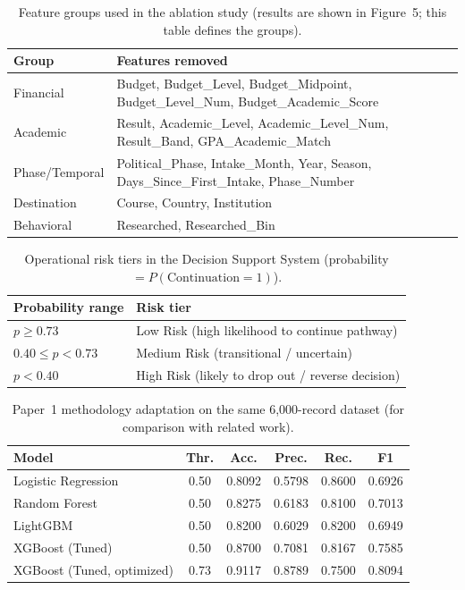 \begin{table}[htbp]
\centering
\caption{Feature groups used in the ablation study
(results are shown in Figure~5; this table defines the groups).}
\label{tab:ablation_groups}
\begin{tabular}{lp{9cm}}
\toprule
\textbf{Group} & \textbf{Features removed} \\
\midrule
Financial & Budget, Budget\_Level, Budget\_Midpoint, Budget\_Level\_Num, Budget\_Academic\_Score \\
Academic & Result, Academic\_Level, Academic\_Level\_Num, Result\_Band, GPA\_Academic\_Match \\
Phase/Temporal & Political\_Phase, Intake\_Month, Year, Season, Days\_Since\_First\_Intake, Phase\_Number \\
Destination & Course, Country, Institution \\
Behavioral & Researched, Researched\_Bin \\
\bottomrule
\end{tabular}
\end{table}


\begin{table}[htbp]
\centering
\caption{Operational risk tiers in the Decision Support System
(probability $= P(\mathrm{Continuation}=1)$).}
\label{tab:risk_tiers}
\begin{tabular}{lp{8.5cm}}
\toprule
\textbf{Probability range} & \textbf{Risk tier} \\
\midrule
$p \ge 0.73$ & Low Risk (high likelihood to continue pathway) \\
$0.40 \le p < 0.73$ & Medium Risk (transitional / uncertain) \\
$p < 0.40$ & High Risk (likely to drop out / reverse decision) \\
\bottomrule
\end{tabular}
\end{table}


\begin{table}[htbp]
\centering
\caption{Paper~1 methodology adaptation on the same 6{,}000-record dataset
(for comparison with related work).}
\label{tab:paper1_comparison}
\begin{tabular}{lccccc}
\toprule
\textbf{Model} & \textbf{Thr.} & \textbf{Acc.} & \textbf{Prec.} & \textbf{Rec.} & \textbf{F1} \\
\midrule
Logistic Regression & 0.50 & 0.8092 & 0.5798 & 0.8600 & 0.6926 \\
Random Forest & 0.50 & 0.8275 & 0.6183 & 0.8100 & 0.7013 \\
LightGBM & 0.50 & 0.8200 & 0.6029 & 0.8200 & 0.6949 \\
XGBoost (Tuned) & 0.50 & 0.8700 & 0.7081 & 0.8167 & 0.7585 \\
XGBoost (Tuned, optimized) & 0.73 & 0.9117 & 0.8789 & 0.7500 & 0.8094 \\
\bottomrule
\end{tabular}
\end{table}


